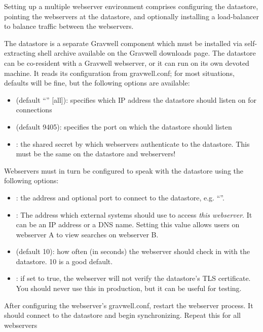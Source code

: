Setting up a multiple webserver environment comprises configuring the
datastore, pointing the webservers at the datastore, and optionally
installing a load-balancer to balance traffic between the webservers.

The datastore is a separate Gravwell component which must be installed
via self-extracting shell archive available on the Gravwell downloads
page. The datastore can be co-resident with a Gravwell webserver, or it
can run on its own devoted machine. It reads its configuration from
gravwell.conf; for most situations, defaults will be fine, but the following
options are available:

\begin{itemize}
\item
   (default ``'' [all]): specifies which
  IP address the datastore should listen on for connections
\item
   (default 9405): specifies the port on which the
  datastore should listen
\item
  : the shared secret by which webservers authenticate to
  the datastore. This must be the same on the datastore and webservers!
\end{itemize}

Webservers must in turn be configured to speak with the datastore using
the following options:

\begin{itemize}
\item
  : the address and optional port to connect to the
  datastore, e.g. ``''.
\item
  : The address which external systems should use to
  access \emph{this webserver}. It can be an IP address or a DNS name.
  Setting this value allows users on webserver A to view searches on
  webserver B.
\item
   (default 10): how often (in seconds) the
  webserver should check in with the datastore. 10 is a good default.
\item
  : if set to true, the webserver will not verify the datastore's TLS certificate. You should never use this in production, but it can be useful for testing.
\end{itemize}

After configuring the webserver's gravwell.conf, restart the webserver
process. It should connect to the datastore and begin synchronizing.
Repeat this for all webservers

